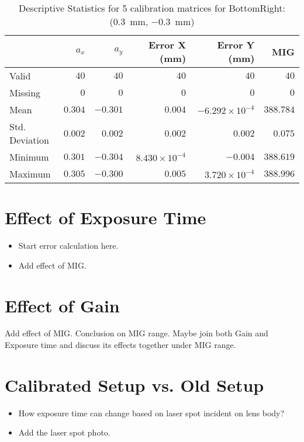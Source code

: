 \begin{table}[h]
    \begin{subtable}{\textwidth}
        \centering
        \footnotesize
        \begin{tabular}{lrrrrr}
            \toprule
                & $a_x$ & $a_y$ & Error X (mm) & Error Y (mm) & MIG  \\
            \midrule
			Valid & $40$ & $40$ & $40$ & $40$ & $40$  \\
			Missing & $0$ & $0$ & $0$ & $0$ & $0$  \\
			Mean & $0.304$ & $-0.301$ & $0.004$ & $-6.292\times10^{-4}$ & $388.784$  \\
			Std. Deviation & $0.002$ & $0.002$ & $0.002$ & $0.002$ & $0.075$  \\
			Minimum & $0.301$ & $-0.304$ & $8.430\times10^{-4}$ & $-0.004$ & $388.619$  \\
			Maximum & $0.305$ & $-0.300$ & $0.005$ & $3.720\times10^{-4}$ & $388.996$  \\
            \bottomrule
        \end{tabular}
        \caption{$T_{Avg}$}
        \end{subtable}

    \caption{Descriptive Statistics for 5 calibration matrices for \textsf{BottomRight:} (\SI{0.3}{\milli\meter}, \SI{-0.3}{\milli\meter})}
    \label{table:stats_matrix_bottomright}
\end{table}

\clearpage

\section{Effect of Exposure Time}

\begin{itemize}
    \item Start error calculation here.
    \item Add effect of MIG.
\end{itemize}


\section{Effect of Gain}
Add effect of MIG.
Conclusion on MIG range.
Maybe join both Gain and Exposure time and discuss its effects together under MIG range.


\section{Calibrated Setup vs. Old Setup}
\begin{itemize}
    \item How exposure time can change based on laser spot incident on lens body?
    \item Add the laser spot photo.
\end{itemize}

